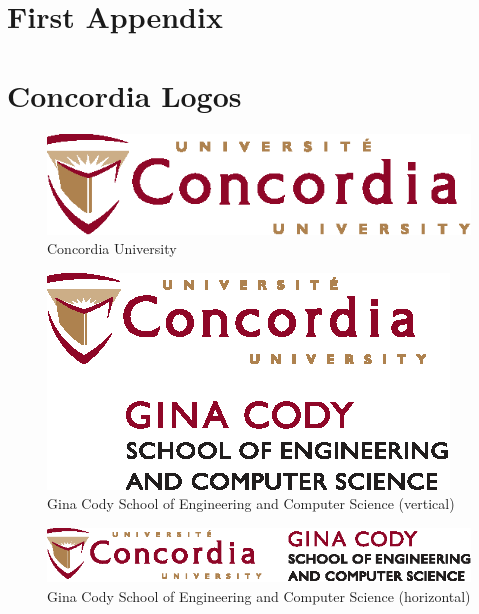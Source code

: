 \documentclass[letterpaper,12pt,onecolumn,final]{report}
\begin{document}
\begin{appendices}
\doublespacing

\chapter{First Appendix}
\label{chap:apdx1}

\blindmathpaper

\chapter{Concordia Logos}
\label{chap:logos}
\begin{figure}[h!]
	\centering
	\includegraphics{logos/Concordia_University_logo}
	\caption{Concordia University}
\end{figure}
\vspace{2em}
\begin{figure}[h!]
	\centering
	\includegraphics{logos/Concordia_GinaCody_vertical}
	\caption{Gina Cody School of Engineering and Computer Science (vertical)}
\end{figure}
\vspace{2em}
\begin{figure}[h!]
	\centering
	\includegraphics{logos/Concordia_GinaCody_horizontal}
	\caption{Gina Cody School of Engineering and Computer Science (horizontal)}
\end{figure}

\end{appendices}
\end{document}
